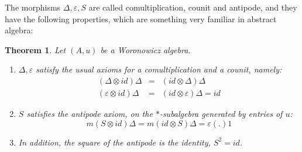 \documentclass[12pt]{amsbook}
\newtheorem{theorem}{Theorem}[chapter]
\begin{document}
The morphisms $\Delta,\varepsilon,S$ are called comultiplication, counit and antipode, and they have the following properties, which are something very familiar in abstract algebra:

\begin{theorem}
Let $(A,u)$ be a Woronowicz algebra.
\begin{enumerate} 
\item $\Delta,\varepsilon$ satisfy the usual axioms for a comultiplication and a counit, namely:
\begin{eqnarray*}
(\Delta\otimes id)\Delta&=&(id\otimes \Delta)\Delta\\
(\varepsilon\otimes id)\Delta&=&(id\otimes\varepsilon)\Delta=id
\end{eqnarray*}

\item $S$ satisfies the antipode axiom, on the $*$-subalgebra generated by entries of $u$: 
$$m(S\otimes id)\Delta=m(id\otimes S)\Delta=\varepsilon(.)1$$

\item In addition, the square of the antipode is the identity, $S^2=id$.
\end{enumerate}
\end{theorem}
\end{document}
